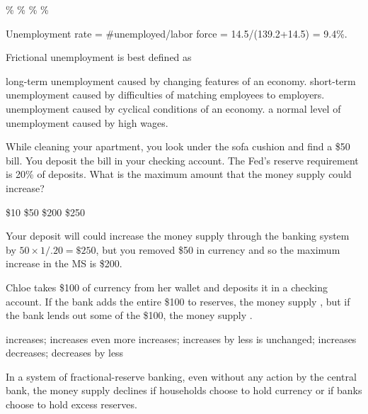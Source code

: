 \documentclass[addpoints,11pt]{exam}
\theoremstyle{definition}
\newcommand{\blank}[0]{\underline{\hspace{3cm}}}
\begin{document}
\begin{questions}
	\begin{choices}
		\%
		\%
		\%
		\%
	\end{choices}
	
	\begin{solution}
		Unemployment rate = \#unemployed/labor force = 14.5/(139.2+14.5) = 9.4\%.
	\end{solution}
	
	\newpage
	
	\question Frictional unemployment is best defined as 
	
	\begin{choices}
		\choice long-term unemployment caused by changing features of an economy.
		\CorrectChoice short-term unemployment caused by difficulties of matching employees to employers.
		\choice unemployment caused by cyclical conditions of an economy.
		\choice a normal level of unemployment caused by high wages. 
	\end{choices}
	
	
	\question While cleaning your apartment, you look under the sofa cushion and find a \$50 bill. You deposit the bill in your checking account. The Fed's reserve requirement is 20\% of deposits. What is the maximum amount that the money supply could increase?
	
	\begin{choices}
		\choice \$10
		\choice \$50
		\CorrectChoice \$200
		\choice \$250
	\end{choices}
	
	\begin{solution}
		Your deposit will could increase the money supply through the banking system by $50 \times 1/.20 = \$250$, but you removed \$50 in currency and so the maximum increase in the MS is \$200.
	\end{solution}
	
	
	\question Chloe takes \$100 of currency from her wallet and deposits it in a checking account. If the bank adds the entire \$100 to reserves, the money supply \blank, but if the bank lends out some of the \$100, the money supply \blank.
	
	\begin{choices}
		\choice increases; increases even more
		\choice increases; increases by less
		\CorrectChoice is unchanged; increases
		\choice decreases; decreases by less
	\end{choices}


	
	\question In a system of fractional-reserve banking, even without any action by the central bank, the money supply declines if households choose to hold \blank currency or if banks choose to hold \blank excess reserves.
	

\end{questions}
\end{document}
